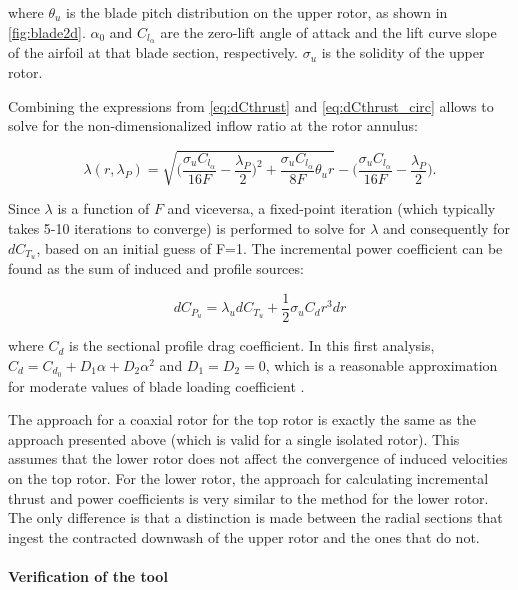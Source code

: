 where $\theta_u$ is the blade pitch distribution on the upper rotor, as shown in \autoref{fig:blade2d}. $\alpha_0$ and $C_{l_\alpha}$ are the zero-lift angle of attack and the lift curve slope of the airfoil at that blade section, respectively. $\sigma_u$ is the solidity of the upper rotor. 

Combining the expressions from \autoref{eq:dCthrust} and \autoref{eq:dCthrust_circ} allows to solve for the non-dimensionalized inflow ratio at the rotor annulus:

\begin{equation}
    \lambda(r,\lambda_P) = \sqrt{\Big(\frac{\sigma_u C_{l_\alpha}}{16 F}-\frac{\lambda_P}{2}\Big)^2+\frac{\sigma_u C_{l_\alpha}}{8F}\theta_u r} - \Big(\frac{\sigma_u C_{l_\alpha}}{16 F}-\frac{\lambda_P}{2} \Big).
\end{equation}

Since $\lambda$ is a function of $F$ and viceversa, a fixed-point iteration (which typically takes 5-10 iterations to converge) is performed to solve for $\lambda$ and consequently for $dC_{T_u}$, based on an initial guess of F=1. The incremental power coefficient can be found as the sum of induced and profile sources:

\begin{equation}
    dC_{P_u} = \lambda_u dC_{T_u} + \frac{1}{2} \sigma_u C_d r^3 dr
\end{equation}

where $C_d$ is the sectional profile drag coefficient. In this first analysis, $C_d = C_{d_0} + D_1 \alpha + D_2 \alpha^2$ and $D_1 = D_2 = 0$, which is a reasonable approximation for moderate values of blade loading coefficient \cite{BEMT}.

The approach for a coaxial rotor for the top rotor is exactly the same as the approach presented above (which is valid for a single isolated rotor). This assumes that the lower rotor does not affect the convergence of induced velocities on the top rotor. For the lower rotor, the approach for calculating incremental thrust and power coefficients is very similar to the method for the lower rotor. The only difference is that a distinction is made between the radial sections that ingest the contracted downwash of the upper rotor and the ones that do not.

\paragraph{Verification of the tool}


